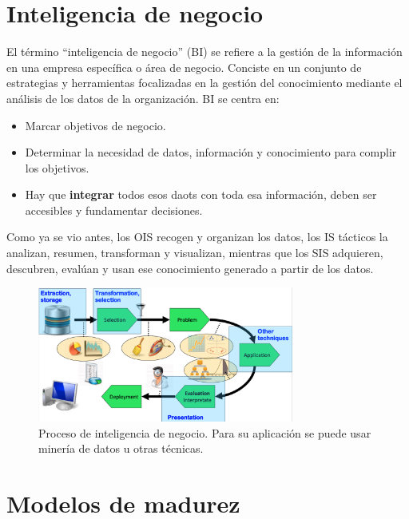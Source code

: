 \section{Inteligencia de negocio}

El término ``inteligencia de negocio'' (BI) se refiere a la gestión de la información en una empresa específica o área de negocio. Conciste en un conjunto de estrategias y herramientas focalizadas en la gestión del conocimiento mediante el análisis de los datos de la organización. BI se centra en:
\begin{itemize}
\item Marcar objetivos de negocio.
\item Determinar la necesidad de datos, información y conocimiento para complir los objetivos.
\item Hay que \textbf{integrar} todos esos daots con toda esa información, deben ser accesibles y fundamentar decisiones.
\end{itemize}

Como ya se vio antes, los OIS recogen y organizan los datos, los IS tácticos la analizan, resumen, transforman y visualizan, mientras que los SIS adquieren, descubren, evalúan y usan ese conocimiento generado a partir de los datos. 

\begin{figure}[h]
\centering
\includegraphics[width=0.75\textwidth]{fotos/4.png}
\caption{Proceso de inteligencia de negocio. Para su aplicación se puede usar minería de datos u otras técnicas.}
\label{fig:4}
\end{figure}

\section{Modelos de madurez}

